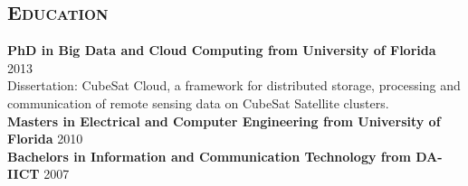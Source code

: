 \begin{resume}
\section{\textsc{Education}}
\textbf{PhD in Big Data and Cloud Computing from University of Florida} \hfill 2013 \\
Dissertation: CubeSat Cloud, a framework for distributed storage, processing and communication of remote sensing data on CubeSat Satellite clusters.\\
\textbf{Masters in Electrical and Computer Engineering from University of Florida} \hfill 2010 \\
\textbf{Bachelors in Information and Communication Technology from DA-IICT} \hfill 2007

\begin{formatb}
  \\
  \body\\
\end{formatb}


\end{resume}

